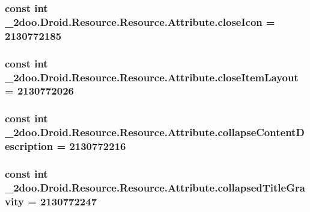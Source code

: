\hypertarget{class__2doo_1_1_droid_1_1_resource_1_1_attribute_3e6a94da0f36b7b3902f261554190e4b}{
\subsubsection[{closeIcon}]{\setlength{\rightskip}{0pt plus 5cm}const int \_\-2doo.Droid.Resource.Resource.Attribute.closeIcon = 2130772185}}
\label{class__2doo_1_1_droid_1_1_resource_1_1_attribute_3e6a94da0f36b7b3902f261554190e4b}


\hypertarget{class__2doo_1_1_droid_1_1_resource_1_1_attribute_a0ea00be9afe13cf574cf2085407c2cc}{
\subsubsection[{closeItemLayout}]{\setlength{\rightskip}{0pt plus 5cm}const int \_\-2doo.Droid.Resource.Resource.Attribute.closeItemLayout = 2130772026}}
\label{class__2doo_1_1_droid_1_1_resource_1_1_attribute_a0ea00be9afe13cf574cf2085407c2cc}


\hypertarget{class__2doo_1_1_droid_1_1_resource_1_1_attribute_f2b22ac1537fea4441a5fbc9c004952b}{
\subsubsection[{collapseContentDescription}]{\setlength{\rightskip}{0pt plus 5cm}const int \_\-2doo.Droid.Resource.Resource.Attribute.collapseContentDescription = 2130772216}}
\label{class__2doo_1_1_droid_1_1_resource_1_1_attribute_f2b22ac1537fea4441a5fbc9c004952b}


\hypertarget{class__2doo_1_1_droid_1_1_resource_1_1_attribute_db8dcb9a0e5907a469db46fc2525fdf8}{
\subsubsection[{collapsedTitleGravity}]{\setlength{\rightskip}{0pt plus 5cm}const int \_\-2doo.Droid.Resource.Resource.Attribute.collapsedTitleGravity = 2130772247}}
\label{class__2doo_1_1_droid_1_1_resource_1_1_attribute_db8dcb9a0e5907a469db46fc2525fdf8}


